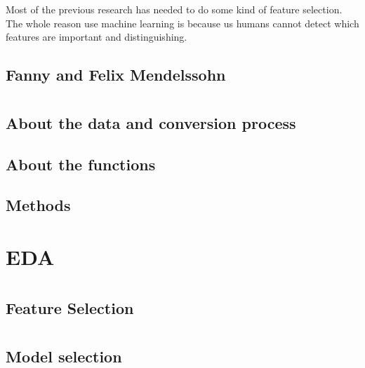 \documentclass[12pt,twoside]{reedthesis}
\theoremstyle{definition}
\theoremstyle{definition}
\theoremstyle{definition}
\theoremstyle{remark}
\begin{document}
Most of the previous research has needed to do some kind of feature
selection. The whole reason use machine learning is because us humans
cannot detect which features are important and distinguishing.

\section{Fanny and Felix Mendelssohn}\label{fanny-and-felix-mendelssohn}

\chapter{}\label{section}

\section{About the data and conversion
process}\label{about-the-data-and-conversion-process}

\section{About the functions}\label{about-the-functions}

\section{Methods}\label{methods}

\chapter{EDA}\label{eda}

\chapter{}\label{section-1}

\section{Feature Selection}\label{feature-selection}

\chapter{}\label{section-2}

\section{Model selection}\label{model-selection}
\end{document}
